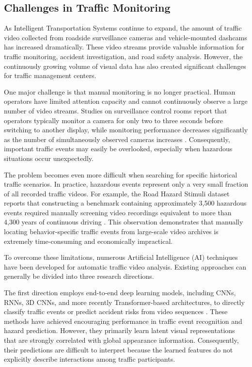 \documentclass[a4paper, 11pt]{article} %
\begin{document}
\subsection{Challenges in Traffic Monitoring}

As Intelligent Transportation Systems continue to expand, the amount of traffic video collected from roadside surveillance cameras and vehicle-mounted dashcams has increased dramatically. These video streams provide valuable information for traffic monitoring, accident investigation, and road safety analysis. However, the continuously growing volume of visual data has also created significant challenges for traffic management centers.

One major challenge is that manual monitoring is no longer practical. Human operators have limited attention capacity and cannot continuously observe a large number of video streams. Studies on surveillance control rooms report that operators typically monitor a camera for only two to three seconds before switching to another display, while monitoring performance decreases significantly as the number of simultaneously observed cameras increases \cite{debruijn2016human}. Consequently, important traffic events may easily be overlooked, especially when hazardous situations occur unexpectedly.

The problem becomes even more difficult when searching for specific historical traffic scenarios. In practice, hazardous events represent only a very small fraction of all recorded traffic videos. For example, the Road Hazard Stimuli dataset reports that constructing a benchmark containing approximately 3,500 hazardous events required manually screening video recordings equivalent to more than 4,300 years of continuous driving \cite{song2024road}. This observation demonstrates that manually locating behavior-specific traffic events from large-scale video archives is extremely time-consuming and economically impractical.

To overcome these limitations, numerous Artificial Intelligence (AI) techniques have been developed for automatic traffic video analysis. Existing approaches can generally be divided into three research directions.

The first direction employs end-to-end deep learning models, including CNNs, RNNs, 3D CNNs, and more recently Transformer-based architectures, to directly classify traffic events or predict accident risks from video sequences \cite{fang2022dada,santhosh2021vehicular,yurtsever2019risky}. These methods have achieved encouraging performance in traffic event recognition and hazard prediction. However, they primarily learn latent visual representations that are strongly correlated with global appearance information. Consequently, their predictions are difficult to interpret because the learned features do not explicitly describe interactions among traffic participants.
\end{document}

